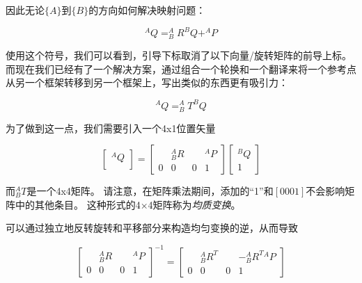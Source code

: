 因此无论$ \{A \} $到$ \{B \} $的方向如何解决映射问题：

\begin{equation}
^AQ=^A_BR^BQ+^AP
\end{equation}

使用这个符号，我们可以看到，引导下标取消了以下向量/旋转矩阵的前导上标。 而现在我们已经有了一个解决方案，通过组合一个轮换和一个翻译来将一个参考点从另一个框架转移到另一个框架上，写出类似的东西更有吸引力：

\begin{equation}
^AQ=^A_BT^BQ
\end{equation}

为了做到这一点，我们需要引入一个4x1位置矢量

\begin{equation}
\left[\begin{array}{c}^AQ\\\end{array}\right]=\left[\begin{array}{ccc|c} & ^A_BR & & ^AP \\\hline 0 & 0 & 0 & 1\end{array}\right]\left[\begin{array}{c}^BQ\\1\end{array}\right]
\end{equation}

而$ ^ A_BT $是一个4x4矩阵。 请注意，在矩阵乘法期间，添加的“1”和$ [0 0 0 1] $不会影响矩阵中的其他条目。 这种形式的4×4矩阵称为\emph {均质变换}。


可以通过独立地反转旋转和平移部分来构造均匀变换的逆，从而导致

\begin{equation}
\left[\begin{array}{ccc|c} & ^A_BR & & ^AP \\\hline 0 & 0 & 0 & 1\end{array}\right]^{-1}=
\left[\begin{array}{ccc|c} & ^A_BR^T & & -^A_B{R^T}{^AP} \\\hline 0 & 0 & 0 & 1\end{array}\right]
\end{equation}

